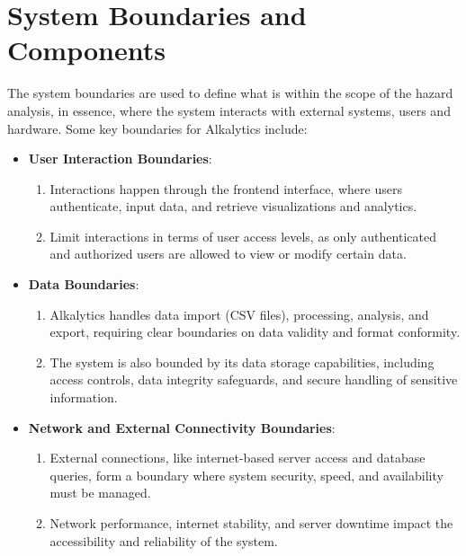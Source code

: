 \documentclass{article}
\begin{document}
\section{System Boundaries and Components}
The system boundaries are used to define what is within the scope of the hazard analysis,
in essence, where the system interacts with external systems, users and hardware. Some key
boundaries for Alkalytics include:
\begin{itemize}
  \item \textbf{User Interaction Boundaries}:
    \begin{enumerate}
      \item Interactions happen through the frontend interface, where users authenticate, 
      input data, and retrieve visualizations and analytics.
      \item Limit interactions in terms of user access levels, as only authenticated and authorized users
      are allowed to view or modify certain data.
    \end{enumerate}
  \item \textbf{Data Boundaries}:
    \begin{enumerate}
      \item Alkalytics handles data import (CSV files), processing, analysis, and export, requiring clear 
      boundaries on data validity and format conformity.
      \item The system is also bounded by its data storage capabilities, including access controls, data integrity 
      safeguards, and secure handling of sensitive information.
    \end{enumerate}
  \item \textbf{Network and External Connectivity Boundaries}:
    \begin{enumerate}
      \item External connections, like internet-based server access and database queries, form a boundary where system 
      security, speed, and availability must be managed.
      \item Network performance, internet stability, and server downtime impact the accessibility and reliability of the system.
    \end{enumerate}
\end{itemize}
\end{document}
